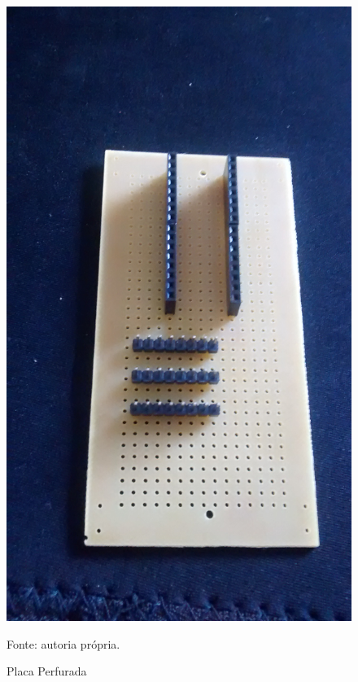 		\begin{figure}[h]
			\centering
			\includegraphics[keepaspectratio=true,scale=0.075]{figuras/placa_furada.jpg}
			\caption{Placa Perfurada}
			\footnotesize Fonte: autoria própria. 
			\label{placa}	
		\end{figure}
	
